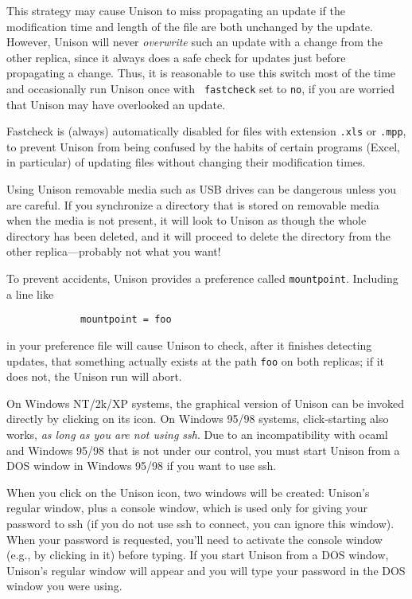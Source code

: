 \documentclass{article}
\begin{document}
This strategy may cause Unison to miss propagating an update if the
 modification time and length of the file are both unchanged
by the update.
However, Unison will never {\em overwrite} such an update with a change
from the other replica, since it always does a safe check for updates
just before propagating a change.  Thus, it is reasonable to use this
switch most of the time and occasionally run Unison once with {\tt
  fastcheck} set to \verb|no|, if you are worried that Unison may have
overlooked an update.

Fastcheck is (always) automatically disabled for files with extension
\verb|.xls| or \verb|.mpp|, to prevent Unison from being confused by the 
habits of certain programs (Excel, in particular) of updating files without
changing their modification times.


Using Unison removable media such as USB drives can be dangerous unless you
are careful.  If you synchronize a directory that is stored on removable
media when the media is not present, it will look to Unison as though the
whole directory has been deleted, and it will proceed to delete the
directory from the other replica---probably not what you want!

To prevent accidents, Unison provides a preference called
\verb|mountpoint|.  Including a line like
\begin{verbatim}
             mountpoint = foo
\end{verbatim}
in your preference file will cause Unison to check, after it finishes
detecting updates, that something actually exists at the path
\verb|foo| on both replicas; if it does not, the Unison run will
abort. 


On Windows NT/2k/XP systems, the graphical version of Unison can be
invoked directly by clicking on its icon.  On Windows 95/98 systems,
click-starting also works, {\em as long as you are not using ssh}.
Due to an incompatibility with ocaml and Windows 95/98 that is not
under our control, you must start Unison from a DOS window in Windows
95/98 if you want to use ssh.

When you click on the Unison icon, two windows will be created:
Unison's regular window, plus a console window, which is used only for
giving your password to ssh (if you do not use ssh to connect, you can
ignore this window).  When your password is requested, you'll need to
activate the console window (e.g., by clicking in it) before typing.
If you start Unison from a DOS window, Unison's regular window will
appear and you will type your password in the DOS window you were
using.
\end{document}
